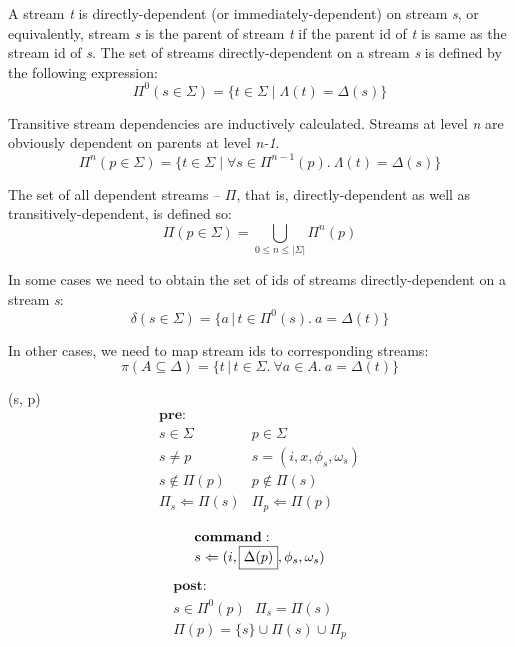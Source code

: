 \documentclass[10pt]{article}
\begin{document}
A stream \emph{t} is directly-dependent (or immediately-dependent) on stream \emph{s}, or equivalently, stream \emph{s} is the parent of stream \emph{t} if the parent id of \emph{t} is same as the stream id of \emph{s}. The set of streams directly-dependent on a stream \emph{s} is defined by the following expression: 
\[
    \Pi^0(s \in \Sigma) = \{ t \in \Sigma \; | \; \Lambda(t) = \Delta(s)  \}
\]

Transitive stream dependencies are inductively calculated. Streams at level \emph{n} are obviously dependent on parents at level \emph{n-1}.
\[
    \Pi^n(p \in \Sigma) = \{ t \in \Sigma \; | \; \forall s \in \Pi^{n-1}(p). \ \Lambda(t) = \Delta(s)  \}
\]

The set of all dependent streams -- $\Pi$, that is, directly-dependent as well as transitively-dependent, is defined so:
\[
     \Pi(p \in \Sigma) = \bigcup_{0 \leq n \leq |\Sigma|}\Pi^n(p)
\]

In some cases we need to obtain the set of ids of streams directly-dependent on a stream \emph{s}:
\[
    \delta(s \in \Sigma) = \{ a \,|\, t \in \Pi^0(s). \ a = \Delta(t) \}
\]

In other cases, we need to map stream ids to corresponding streams:
\[
    \pi(A \subseteq \Delta) = \{ t \,|\, t \in \Sigma. \ \forall a \in A. \ a = \Delta(t) \}
\]

(s, p)\\
\[
\begin{array}{ll}
\mathbf{pre}:&\\
  s \in \Sigma & p \in \Sigma\\
  s \neq p & s = (i, x, \phi_s, \omega_s)\\
  s \notin \Pi(p)  & p \notin \Pi(s)\\
  \Pi_s \Leftarrow \Pi(s) & \Pi_p \Leftarrow \Pi(p)\\
\end{array}
\]
\[
\begin{array}{l}
\mathbf{command}:\\
  s \Leftarrow (i, \fbox{$\Delta(p)$}, \phi_{s}, \omega_{s})\\
\end{array}
\]
\[
\begin{array}{l}
\mathbf{post}:\\
  s \in \Pi^0(p) \ \ \ \Pi_s = \Pi(s)\\
  \Pi(p) = \{s\} \cup \Pi(s) \cup \Pi_p \\
\end{array}
\]
\end{document}
